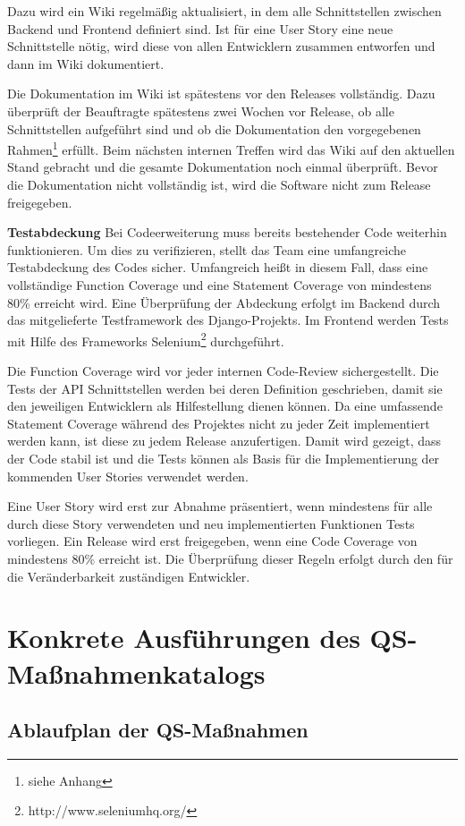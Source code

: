 \documentclass[accentcolor=tud0b,12pt,paper=a4]{tudreport}
\begin{document}
Dazu wird ein Wiki regelmäßig aktualisiert, in dem alle Schnittstellen zwischen Backend und Frontend definiert sind. Ist für eine User Story eine neue Schnittstelle nötig, wird diese von allen Entwicklern zusammen entworfen und dann im Wiki dokumentiert.

Die Dokumentation im Wiki ist spätestens vor den Releases vollständig. Dazu überprüft der Beauftragte spätestens zwei Wochen vor Release, ob alle Schnittstellen aufgeführt sind und ob die Dokumentation den vorgegebenen Rahmen\footnote{siehe Anhang} erfüllt. Beim nächsten internen Treffen wird das Wiki auf den aktuellen Stand gebracht und die gesamte Dokumentation noch einmal überprüft. Bevor die Dokumentation nicht vollständig ist, wird die Software nicht zum Release freigegeben.


\textbf{Testabdeckung}
Bei Codeerweiterung muss bereits bestehender Code weiterhin funktionieren. Um dies zu verifizieren, stellt das Team eine umfangreiche Testabdeckung des Codes sicher. Umfangreich heißt in diesem Fall, dass eine vollständige Function Coverage und eine Statement Coverage von mindestens 80\% erreicht wird. Eine Überprüfung der Abdeckung erfolgt im Backend durch das mitgelieferte Testframework des Django-Projekts. Im Frontend werden Tests mit Hilfe des Frameworks Selenium\footnote{http://www.seleniumhq.org/} durchgeführt.

Die Function Coverage wird vor jeder internen Code-Review sichergestellt. Die Tests der API Schnittstellen werden bei deren Definition geschrieben, damit sie den jeweiligen Entwicklern als Hilfestellung dienen können. Da eine umfassende Statement Coverage während des Projektes nicht zu jeder Zeit implementiert werden kann, ist diese zu jedem Release anzufertigen. Damit wird gezeigt, dass der Code stabil ist und die Tests können als Basis für die Implementierung der kommenden User Stories verwendet werden.

Eine User Story wird erst zur Abnahme präsentiert, wenn mindestens für alle durch diese Story verwendeten und neu implementierten Funktionen Tests vorliegen. Ein Release wird erst freigegeben, wenn eine Code Coverage von mindestens 80\% erreicht ist. Die Überprüfung dieser Regeln erfolgt durch den für die Veränderbarkeit zuständigen Entwickler.


\appendix
\chapter{Konkrete Ausführungen des QS-Maßnahmenkatalogs}
\section{Ablaufplan der QS-Maßnahmen}
\end{document}
